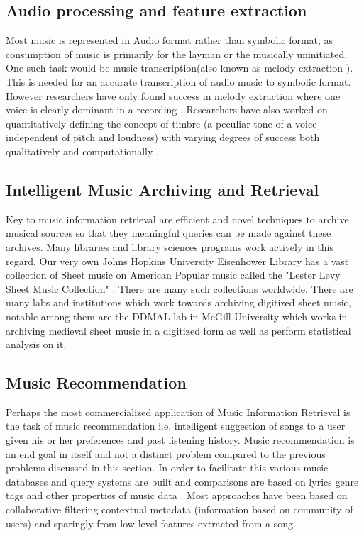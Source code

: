 \subsection{Audio processing and feature extraction}

\noindent Most music is represented in Audio format rather than symbolic format, as consumption of music is primarily for the layman or the musically uninitiated. One such task would be music transcription(also known as melody extraction \cite{melextract}). This is needed for an accurate transcription of audio music to symbolic format. However researchers have only found success in melody extraction where one voice is clearly dominant in a recording \cite{melextract}. Researchers have also worked on quantitatively defining the concept of timbre (a peculiar tone of a voice independent of pitch and loudness) with varying degrees of success both qualitatively \cite{timbrequal} and computationally \cite{musiclisteningthesis}. 

\subsection{Intelligent Music Archiving and Retrieval}

\noindent Key to music information retrieval are efficient and novel techniques to archive musical sources so that they meaningful queries can be made against these archives. Many libraries and library sciences programs work actively in this regard. Our very own Johns Hopkins University Eisenhower Library has a vast collection of Sheet music on American Popular music called the "Lester Levy Sheet Music Collection" \cite{Levy:Collection:Online} . There are many such collections worldwide. There are many labs and institutions which work towards archiving digitized sheet music, notable among them are the DDMAL lab in McGill University \cite{DDMAL} which works in archiving medieval sheet music in a digitized form as well as perform statistical analysis on it. 

\subsection{Music Recommendation}

\noindent Perhaps the most commercialized application of Music Information Retrieval is the task of music recommendation i.e. intelligent suggestion of songs to a user given his or her preferences and past listening history. Music recommendation is an end goal in itself and not a distinct problem compared to the previous problems discussed in this section. In order to facilitate this various music databases and query systems are built and comparisons are based on lyrics genre tags and other properties of music data \cite{musicrecSurvey}. Most approaches have been based on collaborative filtering contextual metadata (information based on community of users) and sparingly from low level features extracted from a song. 

